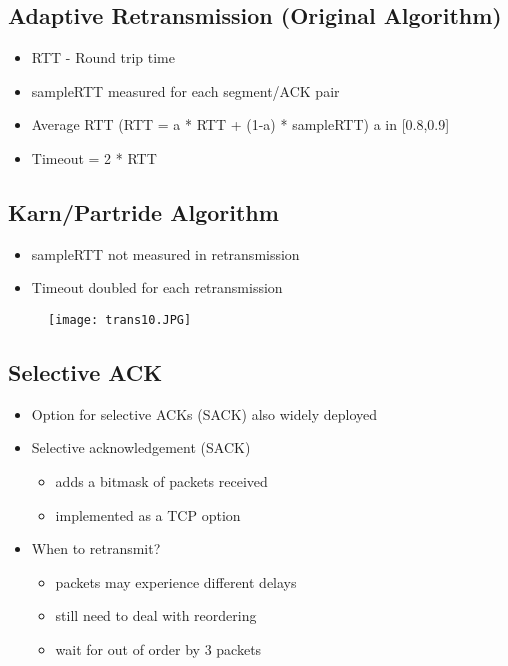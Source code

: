 \documentclass[../resumosRCOM.tex]{subfiles}
\begin{document}
\subsection{Adaptive Retransmission (Original Algorithm)}
\begin{itemize}
    \item RTT - Round trip time
    \item sampleRTT measured for each segment/ACK pair
    \item Average RTT (RTT = a * RTT + (1-a) * sampleRTT) a in [0.8,0.9]
    \item Timeout = 2 * RTT
\end{itemize}

\subsection{Karn/Partride Algorithm}
\begin{itemize}
    \item sampleRTT not measured in retransmission
    \item Timeout doubled for each retransmission
\end{itemize}
\begin{figure}[h]
    \centering
    \texttt{[image: trans10.JPG]}
\end{figure}

\subsection{Selective ACK}
\begin{itemize}
    \item Option for selective ACKs (SACK) also widely deployed
    \item Selective acknowledgement (SACK)
    \begin{itemize}
        \item adds a bitmask of packets received
        \item implemented as a TCP option
    \end{itemize}
    \item When to retransmit?
    \begin{itemize}
        \item packets may experience different delays
        \item still need to deal with reordering
        \item wait for out of order by 3 packets
    \end{itemize}
\end{itemize}
\end{document}
